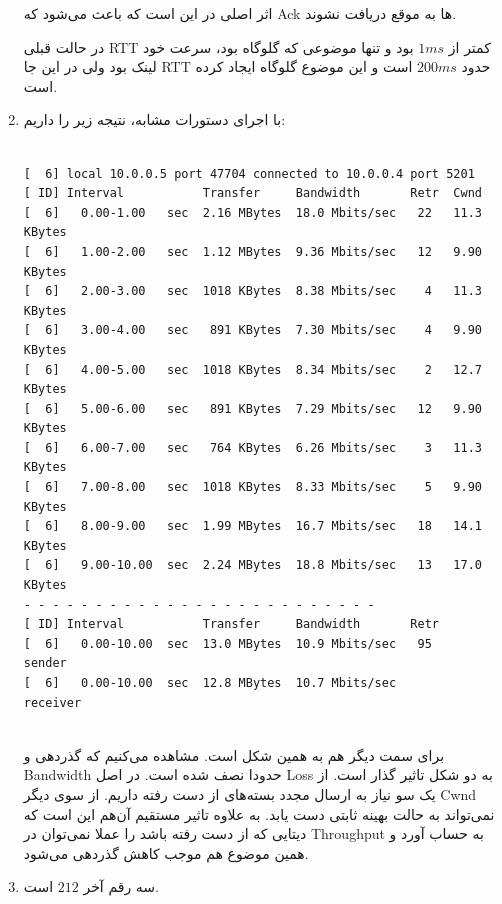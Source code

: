 \documentclass[12pt]{article}
\begin{document}
\begin{enumerate}
اثر اصلی  در این است که باعث می‌شود که Ack ها به موقع دریافت نشوند.

در حالت قبلی RTT کمتر از $1ms$ بود و تنها موضوعی که گلوگاه بود، سرعت خود لینک بود ولی در این جا RTT حدود $200ms$ است و این موضوع گلوگاه ایجاد کرده است.

\item


با اجرای دستورات مشابه، نتیجه زیر را داریم:

\begin{latin}
	\begin{Verbatim}

[  6] local 10.0.0.5 port 47704 connected to 10.0.0.4 port 5201
[ ID] Interval           Transfer     Bandwidth       Retr  Cwnd
[  6]   0.00-1.00   sec  2.16 MBytes  18.0 Mbits/sec   22   11.3 KBytes       
[  6]   1.00-2.00   sec  1.12 MBytes  9.36 Mbits/sec   12   9.90 KBytes       
[  6]   2.00-3.00   sec  1018 KBytes  8.38 Mbits/sec    4   11.3 KBytes       
[  6]   3.00-4.00   sec   891 KBytes  7.30 Mbits/sec    4   9.90 KBytes       
[  6]   4.00-5.00   sec  1018 KBytes  8.34 Mbits/sec    2   12.7 KBytes       
[  6]   5.00-6.00   sec   891 KBytes  7.29 Mbits/sec   12   9.90 KBytes       
[  6]   6.00-7.00   sec   764 KBytes  6.26 Mbits/sec    3   11.3 KBytes       
[  6]   7.00-8.00   sec  1018 KBytes  8.33 Mbits/sec    5   9.90 KBytes       
[  6]   8.00-9.00   sec  1.99 MBytes  16.7 Mbits/sec   18   14.1 KBytes       
[  6]   9.00-10.00  sec  2.24 MBytes  18.8 Mbits/sec   13   17.0 KBytes       
- - - - - - - - - - - - - - - - - - - - - - - - -
[ ID] Interval           Transfer     Bandwidth       Retr
[  6]   0.00-10.00  sec  13.0 MBytes  10.9 Mbits/sec   95             sender
[  6]   0.00-10.00  sec  12.8 MBytes  10.7 Mbits/sec                  receiver


	\end{Verbatim}
\end{latin}


برای سمت دیگر هم به همین شکل است. مشاهده‌ می‌کنیم که گذردهی و Bandwidth حدودا نصف شده است. 
در اصل Loss به دو شکل تاثیر گذار است. از یک سو نیاز به ارسال مجدد بسته‌های از دست رفته داریم. از سوی دیگر Cwnd نمی‌تواند به حالت بهینه ثابتی دست یابد. به علاوه تاثیر مستقیم آن‌هم این است که دیتایی که از دست رفته باشد را عملا نمی‌توان در Throughput به حساب آورد و همین موضوع هم موجب کاهش گذردهی می‌شود.


\item

سه رقم آخر $212$ است.


\end{enumerate}
\end{document}
